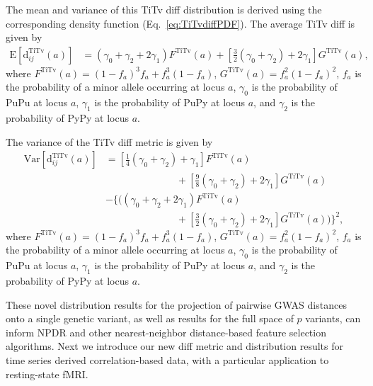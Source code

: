 \documentclass[aos]{imsart}
\begin{document}
The mean and variance of this TiTv diff distribution is derived using the corresponding density function (Eq.~\ref{eq:TiTvdiffPDF}). The average TiTv diff is given by
%
\begin{equation}\label{eq:TiTvdiffMean}
\begin{aligned}
\text{E}\left[\text{d}^\text{TiTv}_{ij}(a)\right] &= (\gamma_0 + \gamma_2 + 2\gamma_1)F^\text{TiTv}(a) + \left[\frac{3}{2}(\gamma_0 + \gamma_2) + 2\gamma_1\right] G^\text{TiTv}(a),
\end{aligned}
\end{equation}
%
where $F^\text{TiTv}(a) = \left(1 - f_a\right)^3 f_a + f^3_a \left(1 - f_a\right)$, $G^\text{TiTv}(a) = f^2_a \left(1 - f_a\right)^2$, $f_a$ is the probability of a minor allele occurring at locus $a$, $\gamma_0$ is the probability of PuPu at locus $a$, $\gamma_1$ is the probability of PuPy at locus $a$, and $\gamma_2$ is the probability of PyPy at locus $a$.

The variance of the TiTv diff metric is given by
%
\begin{equation}\label{eq:TiTvdiffVar}
\begin{aligned}
\text{Var}\left[\text{d}^\text{TiTv}_{ij}(a)\right] &= \left[\frac{1}{4}(\gamma_0 + \gamma_2) + \gamma_1\right] F^\text{TiTv}(a) \\
&\hspace{3cm}+ \left[\frac{9}{8}(\gamma_0 + \gamma_2) + 2\gamma_1\right] G^\text{TiTv}(a) \\
&- {\Biggl\{}{\biggl(}(\gamma_0 + \gamma_2 + 2\gamma_1)F^\text{TiTv}(a) \\
&\hspace{3cm}+ \left[\frac{3}{2}(\gamma_0 + \gamma_2) + 2\gamma_1\right] G^\text{TiTv}(a){\biggr)}{\Biggr\}}^2,
\end{aligned}
\end{equation}
%
where $F^\text{TiTv}(a) = \left(1 - f_a\right)^3 f_a + f^3_a \left(1 - f_a\right)$, $G^\text{TiTv}(a) = f^2_a \left(1 - f_a\right)^2$, $f_a$ is the probability of a minor allele occurring at locus $a$, $\gamma_0$ is the probability of PuPu at locus $a$, $\gamma_1$ is the probability of PuPy at locus $a$, and $\gamma_2$ is the probability of PyPy at locus $a$.

These novel distribution results for the projection of pairwise GWAS distances onto a single genetic variant, as well as results for the full space of $p$ variants, can inform NPDR and other nearest-neighbor distance-based feature selection algorithms. Next we introduce our new diff metric and distribution results for time series derived correlation-based data, with a particular application to resting-state fMRI.
\end{document}
